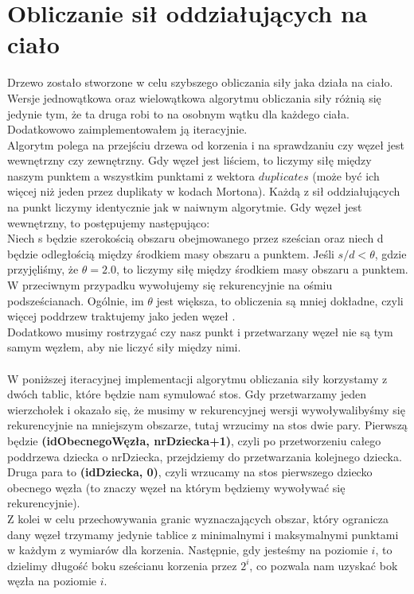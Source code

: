 \documentclass[14pt,twoside,a4paper]{article}
\theoremstyle{definition}
\begin{document}
\section{\LARGE Obliczanie sił oddziałujących na ciało}

Drzewo zostało stworzone w celu szybszego obliczania siły jaka działa na ciało.\\
Wersje jednowątkowa oraz wielowątkowa algorytmu obliczania siły różnią się jedynie tym, że ta druga robi to na osobnym wątku dla każdego ciała. Dodatkowowo zaimplementowałem ją iteracyjnie.\\
\bigskip
Algorytm polega na przejściu drzewa od korzenia i na sprawdzaniu czy węzeł jest wewnętrzny czy zewnętrzny. Gdy węzeł jest liściem, to liczymy siłę między naszym punktem a wszystkim punktami z wektora $duplicates$ (może być ich więcej niż jeden przez duplikaty w kodach Mortona). Każdą z sił oddziałujących na punkt liczymy identycznie jak w naiwnym algorytmie. Gdy węzeł jest wewnętrzny, to postępujemy następująco:\\
\bigskip
Niech s będzie szerokością obszaru obejmowanego przez sześcian oraz niech d będzie odległością między środkiem masy obszaru a punktem. Jeśli $s/d < \theta$, gdzie przyjęliśmy, że $\theta = 2.0$, to liczymy siłę między środkiem masy obszaru a punktem. W przeciwnym przypadku wywołujemy się rekurencyjnie na ośmiu podsześcianach. Ogólnie, im $\theta$ jest większa, to obliczenia są mniej dokładne, czyli więcej poddrzew traktujemy jako jeden węzeł \cite{Aarseth}.\\
\bigskip
Dodatkowo musimy rostrzygać czy nasz punkt i przetwarzany węzeł nie są tym samym węzłem, aby nie liczyć siły między nimi.\\~\\
W poniższej iteracyjnej implementacji algorytmu obliczania siły korzystamy z dwóch tablic, które będzie nam symulować stos. Gdy przetwarzamy jeden wierzchołek i okazało się, że musimy w rekurencyjnej wersji wywoływalibyśmy się rekurencyjnie na mniejszym obszarze, tutaj wrzucimy na stos dwie pary. Pierwszą będzie \textbf{(idObecnegoWęzła, nrDziecka+1)}, czyli po przetworzeniu całego poddrzewa dziecka o  nrDziecka, przejdziemy do przetwarzania kolejnego dziecka. Druga para to \textbf{(idDziecka, 0)}, czyli wrzucamy na stos pierwszego dziecko obecnego węzła (to znaczy węzeł na którym będziemy wywoływać się rekurencyjnie).\\
\bigskip
Z kolei w celu przechowywania granic wyznaczających obszar, który ogranicza dany węzeł trzymamy jedynie tablice z minimalnymi i maksymalnymi punktami w każdym z wymiarów dla korzenia. Następnie, gdy jesteśmy na poziomie $i$, to dzielimy długość boku sześcianu korzenia przez $2^{i}$, co pozwala nam uzyskać bok węzła na poziomie $i$.
\end{document}
